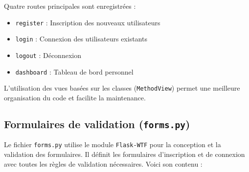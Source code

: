 \documentclass[a4paper,11pt]{article}
\begin{document}
                \noindent Quatre routes principales sont enregistrées :

                \begin{itemize}
                    \item \texttt{\/register\/} : Inscription des nouveaux utilisateurs
                    \item \texttt{\/login\/} : Connexion des utilisateurs existants
                    \item \texttt{\/logout\/} : Déconnexion
                    \item \texttt{\/dashboard\/} : Tableau de bord personnel
                \end{itemize}

                \noindent L'utilisation des vues basées sur les classes (\texttt{MethodView}) permet une meilleure organisation du code et facilite la maintenance.

            \subsection{Formulaires de validation (\texttt{forms.py})}
                \noindent Le fichier \texttt{forms.py} utilise le module \texttt{Flask-WTF} pour la conception et la validation des formulaires. Il définit les formulaires d'inscription et de connexion avec toutes les règles de validation nécessaires. Voici son contenu :

                
\end{document}
